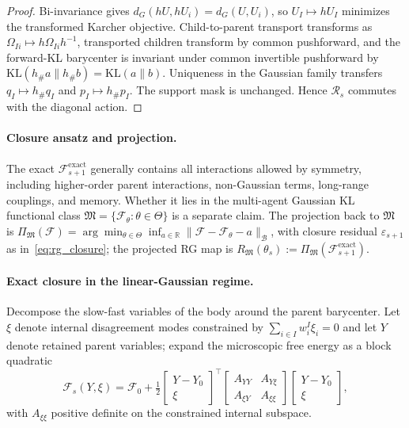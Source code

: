 \documentclass[11pt]{article}
\begin{document}
\begin{proof}
Bi-invariance gives $d_G(hU, hU_i) = d_G(U, U_i)$, so $U_I \mapsto hU_I$ minimizes the transformed Karcher objective. Child-to-parent transport transforms as $\Omega_{Ii} \mapsto h\Omega_{Ii}h^{-1}$, transported children transform by common pushforward, and the forward-KL barycenter is invariant under common invertible pushforward by $\mathrm{KL}(h_\# a \| h_\# b) = \mathrm{KL}(a \| b)$. Uniqueness in the Gaussian family transfers $q_I \mapsto h_\# q_I$ and $p_I \mapsto h_\# p_I$. The support mask is unchanged. Hence $\mathcal{R}_s$ commutes with the diagonal action.
\end{proof}

\paragraph{Closure ansatz and projection.}
The exact $\mathcal{F}_{s+1}^{\mathrm{exact}}$ generally contains all interactions allowed by symmetry, including higher-order parent interactions, non-Gaussian terms, long-range couplings, and memory. Whether it lies in the multi-agent Gaussian KL functional class $\mathfrak{M} = \{\mathcal{F}_\theta : \theta \in \Theta\}$ is a separate claim. The projection back to $\mathfrak{M}$ is $\Pi_\mathfrak{M}(\mathcal{F}) = \arg\min_{\theta \in \Theta} \inf_{a \in \mathbb{R}}\|\mathcal{F} - \mathcal{F}_\theta - a\|_\mathcal{B}$, with closure residual $\varepsilon_{s+1}$ as in~\eqref{eq:rg_closure}; the projected RG map is $R_\mathfrak{M}(\theta_s) := \Pi_\mathfrak{M}(\mathcal{F}_{s+1}^{\mathrm{exact}})$.

\paragraph{Exact closure in the linear-Gaussian regime.}
Decompose the slow-fast variables of the body around the parent barycenter. Let $\xi$ denote internal disagreement modes constrained by $\sum_{i \in I} w_i^I \xi_i = 0$ and let $Y$ denote retained parent variables; expand the microscopic free energy as a block quadratic
\begin{equation}
\mathcal{F}_s(Y, \xi) = \mathcal{F}_0 + \tfrac{1}{2}\begin{bmatrix} Y - Y_0 \\ \xi \end{bmatrix}^\top \begin{bmatrix} A_{YY} & A_{Y\xi} \\ A_{\xi Y} & A_{\xi\xi} \end{bmatrix} \begin{bmatrix} Y - Y_0 \\ \xi \end{bmatrix},
\end{equation}
with $A_{\xi\xi}$ positive definite on the constrained internal subspace.
\end{document}
